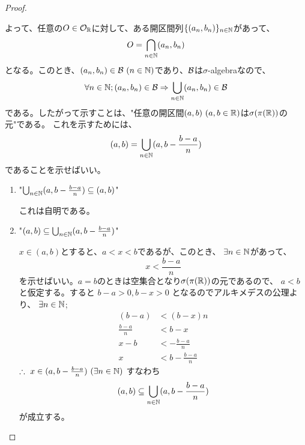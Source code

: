 \begin{proof}
\begin{enumerate}[font = \bfseries, label = step \arabic*.]
                    よって、任意の$O\in\mathcal{O}_{{\mathbb{R}}}$に対して、ある開区間列$\{(a_n, b_n)\}_{n\in{\mathbb{N}}}$があって、
                    \[
                        O = \bigcap_{n\in{\mathbb{N}}} (a_n, b_n)
                    \]
                    となる。このとき、$(a_n, b_n)\in\BB\ (n\in\NN)$であり、${\mathcal{B}}$は$\sigma$-algebraなので、
                    \[
                        \forall n \in {\mathbb{N}}; (a_n, b_n)\in{\mathcal{B}}\Rightarrow \bigcup_{n\in{\mathbb{N}}}(a_n, b_n)\in{\mathcal{B}}
                    \]
                    である。したがって示すことは、"任意の開区間$(a, b)\ (a, b\in {\mathbb{R}})$は$\sigma(\pi({\mathbb{R}}))$の元"である。
                    これを示すためには、
                    \[
                        (a, b) = \bigcup_{n\in{\mathbb{N}}}(a, b - \frac{b - a}{n})
                    \]
                    であることを示せばいい。
                    \begin{enumerate}
                        \item "$\bigcup_{n\in{\mathbb{N}}}(a, b - \frac{b - a}{n}) \subseteq (a, b)$"\par
                            これは自明である。
                        \item "$(a, b) \subseteq \bigcup_{n\in{\mathbb{N}}}(a, b - \frac{b - a}{n})$"\par
                            $x \in (a, b)$とすると、$a < x < b$であるが、このとき、
                            $\exists n\in {\mathbb{N}}$があって、
                            \[
                                x < \frac{b-a}{n}
                            \]
                            を示せばいい。$a = b$のときは空集合となり$\sigma(\pi({\mathbb{R}}))$の元であるので、
                            $a < b$と仮定する。すると
                            $b - a > 0, b - x > 0$
                            となるのでアルキメデスの公理より、
                            $\exists n \in {\mathbb{N}}$;
                            \begin{align*}
                                (b-a) &< (b-x)n \\
                                \frac{b-a}{n} &< b-x \\
                                x - b &< -\frac{b-a}{n} \\
                                x &< b - \frac{b-a}{n}
                            \end{align*}
                            $\therefore\ x\in (a, b - \frac{b-a}{n})\ (\exists n\in {\mathbb{N}})$
                            すなわち
                            \[
                                (a, b) \subseteq \bigcup_{n\in{\mathbb{N}}}(a, b - \frac{b - a}{n})
                            \]
                            が成立する。
                    \end{enumerate}
            \end{enumerate}
        \end{proof}
    
